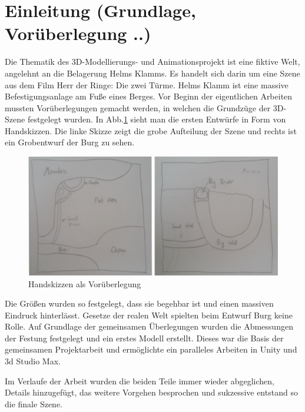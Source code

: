 \section{Einleitung (Grundlage, Vorüberlegung ..)}

Die Thematik des 3D-Modellierungs- und Animationsprojekt ist eine fiktive Welt, angelehnt an die Belagerung Helms Klamms. Es handelt sich darin um eine Szene aus dem Film Herr der Ringe: Die zwei Türme. Helms Klamm ist eine massive Befestigungsanlage am Fuße eines Berges. Vor Beginn der eigentlichen Arbeiten mussten Vorüberlegungen gemacht werden, in welchen die Grundzüge der 3D-Szene festgelegt wurden. In Abb.\ref{handskizze} sieht man die ersten Entwürfe in Form von Handskizzen. Die linke Skizze zeigt die grobe Aufteilung der Szene und rechts ist ein Grobentwurf der Burg zu sehen.

\begin{figure}[h]
	
	\centering
	\includegraphics[width=0.95\linewidth]{Abbildungen/Unity/Skizzen}
	\caption{Handskizzen als Vorüberlegung}
	\label{handskizze}
\end{figure}


Die Größen wurden so festgelegt, dass sie begehbar ist und einen massiven Eindruck hinterlässt. Gesetze der realen Welt spielten beim Entwurf Burg keine Rolle. Auf Grundlage der gemeinsamen Überlegungen wurden die Abmessungen der Festung festgelegt und ein erstes Modell erstellt. Dieses war die Basis der gemeinsamen Projektarbeit und ermöglichte ein paralleles Arbeiten in Unity und 3d Studio Max.

Im Verlaufe der Arbeit wurden die beiden Teile immer wieder abgeglichen, Details hinzugefügt, das weitere Vorgehen besprochen und sukzessive entstand so die finale Szene. 